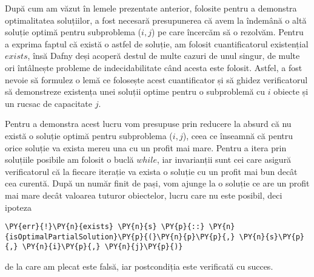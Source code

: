 \begin{sloppypar}
\begin{enumerate}
\begin{Verbatim}[commandchars=\\\{\}]
\end{Verbatim}
    După cum am văzut în lemele prezentate anterior, folosite pentru a demonstra optimalitatea soluțiilor, a fost necesară presupunerea că avem la îndemână o altă soluție optimă pentru subproblema ($i, j$) pe care încercăm să o rezolvăm. Pentru a exprima faptul că există o astfel de soluție, am folosit cuantificatorul existențial $exists$, însă Dafny deși acoperă destul de multe cazuri de unul singur, de multe ori întâlnește probleme de indecidabilitate când acesta este folosit. Astfel, a fost nevoie să formulez o lemă ce folosește acest cuantificator și să ghidez verificatorul să demonstreze existența unei soluții optime pentru o subproblemă cu $i$ obiecte și un rucsac de capacitate $j$. \par
    \hspace{2mm} Pentru a demonstra acest lucru vom presupuse prin reducere la absurd că nu există o soluție optimă pentru subproblema ($i, j$), ceea ce  înseamnă că pentru orice soluție va exista mereu una cu un profit mai mare. Pentru a itera prin soluțiile posibile am folosit o buclă $while$, iar invarianții sunt cei care asigură verificatorul că la fiecare iterație va exista o soluție cu un profit mai bun decât cea curentă. După un număr finit de pași, vom ajunge la o soluție ce are un profit mai mare decât valoarea tuturor obiectelor, lucru care nu este posibil, deci ipoteza
    \begin{Verbatim}[commandchars=\\\{\}]
\PY{err}{!}\PY{n}{exists} \PY{n}{s} \PY{p}{::} \PY{n}{isOptimalPartialSolution}\PY{p}{(}\PY{n}{p}\PY{p}{,} \PY{n}{s}\PY{p}{,} \PY{n}{i}\PY{p}{,} \PY{n}{j}\PY{p}{)}
\end{Verbatim}
    de la care am plecat este falsă, iar postcondiția este verificată cu succes.
\end{enumerate}

\end{sloppypar}